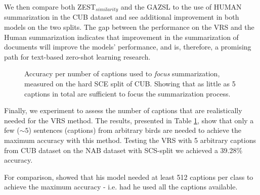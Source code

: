 \documentclass[11pt,a4paper]{article}
\newcommand\yuval[1]{\textcolor{darkpink}{\textbf{YUVAL:} #1 }}
\begin{document}
 
We then compare both ZEST$_{similarity}$ and the GAZSL to the use of HUMAN summarization in the CUB dataset and see additional improvement in both models on the two splits. The gap between the performance on the VRS and the Human summarization indicates that improvement in the summarization of documents will improve the models' performance, and is, therefore, a promising path for text-based zero-shot learning research.


\begin{figure}[t]
\centering
{}
 \caption{Accuracy per number of captions used to \textit{focus}  summarization, measured on the hard SCE split of CUB. Showing that as little as 5 captions in total are sufficient to focus the summarization process.
 }
\label{fig:captions}
\end{figure}


Finally, we experiment to assess the number of captions that are realistically needed for the VRS method. The results, presented in Table \ref{fig:captions}, show that only a few ($\sim5$) 
 sentences (captions) from arbitrary birds are needed to achieve the maximum accuracy with this method.
Testing the VRS with 5 arbitrary captions from CUB dataset on the NAB dataset with SCS-split we achieved a 39.28\% accuracy. %

For comparison, \citet{reed2016learning} showed that his model needed at least 512 captions per class to achieve the maximum accuracy - i.e. had he used all the captions available.
\end{document}
